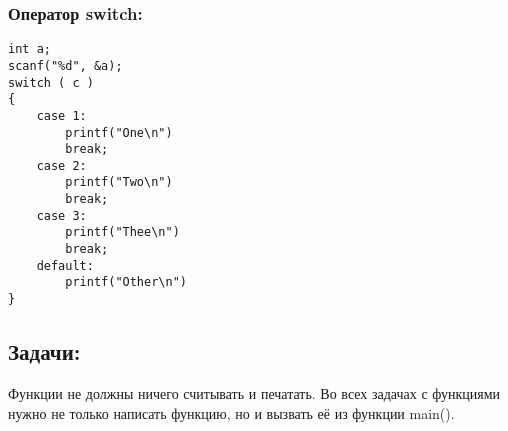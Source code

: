 \documentclass{article}
\begin{document}
\subsubsection*{Оператор switch:}
\begin{verbatim}
int a;
scanf("%d", &a);
switch ( c )  
{  
    case 1:  
        printf("One\n") 
        break; 
    case 2:  
        printf("Two\n")  
        break;  
    case 3:  
        printf("Thee\n")  
        break; 
    default:  
        printf("Other\n")  
}  

\end{verbatim}


\newpage

\subsection*{Задачи:}
Функции не должны ничего считывать и печатать. Во всех задачах с функциями нужно не только написать функцию, но и вызвать её из функции main().
\end{document}
